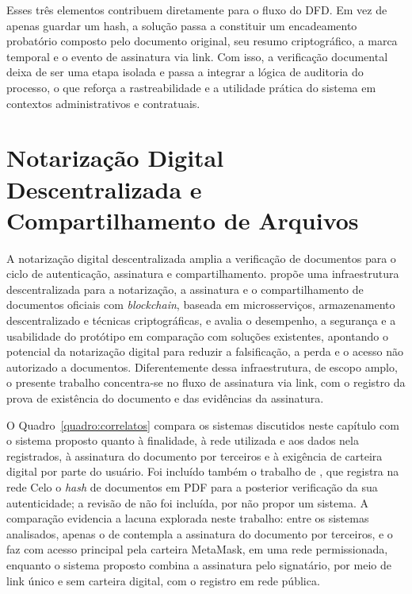 \documentclass[
    12pt,
    a4paper,
    oneside,
    chapter=TITLE,
    section=TITLE,
    subsection=TITLE,
    subsubsection=TITLE,
    sumario=tradicional,
    english,
    brazil
]{abntex2}
\begin{document}
Esses três elementos contribuem diretamente para o fluxo do DFD. Em
vez de apenas guardar um hash, a solução passa a constituir um
encadeamento probatório composto pelo documento original, seu resumo
criptográfico, a marca temporal e o evento de assinatura via link.
Com isso, a verificação documental deixa de ser uma etapa isolada e
passa a integrar a lógica de auditoria do processo, o que reforça a
rastreabilidade e a utilidade prática do sistema em contextos
administrativos e contratuais.

\section{Notarização Digital Descentralizada e Compartilhamento de Arquivos}

A notarização digital descentralizada amplia a verificação de
documentos para o ciclo de autenticação, assinatura e compartilhamento.
 propõe uma infraestrutura descentralizada para a
notarização, a assinatura e o compartilhamento de documentos oficiais
com \emph{blockchain}, baseada em microsserviços, armazenamento
descentralizado e técnicas criptográficas, e avalia o desempenho, a
segurança e a usabilidade do protótipo em comparação com soluções
existentes, apontando o potencial da notarização digital para reduzir a
falsificação, a perda e o acesso não autorizado a documentos.
Diferentemente dessa infraestrutura, de escopo amplo, o presente
trabalho concentra-se no fluxo de assinatura via link, com o registro
da prova de existência do documento e das evidências da assinatura.

O Quadro~\ref{quadro:correlatos} compara os sistemas discutidos neste
capítulo com o sistema proposto quanto à finalidade, à rede utilizada
e aos dados nela registrados, à assinatura do documento por terceiros
e à exigência de carteira digital por parte do usuário. Foi incluído
também o trabalho de , que registra na rede Celo
o \emph{hash} de documentos em PDF para a posterior verificação da sua
autenticidade; a revisão de  não foi incluída,
por não propor um sistema. A comparação evidencia a lacuna explorada
neste trabalho: entre os sistemas analisados, apenas o de
 contempla a assinatura do documento por
terceiros, e o faz com acesso principal pela carteira MetaMask, em uma
rede permissionada, enquanto o sistema proposto combina a assinatura
pelo signatário, por meio de link único e sem carteira digital, com o
registro em rede pública.
\end{document}
